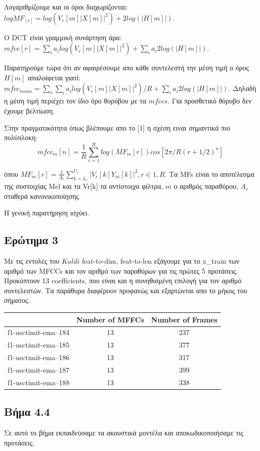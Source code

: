 \documentclass[12pt]{article}
\begin{document}
Λογαριθμίζουμε και οι όροι διαχωρίζονται:
$logMF_[r] =  log(V_r[m]|X[m]|^2) + 2log(|H[m]|) $. 

Ο DCT είναι γραμμική συνάρτηση άρα: $mfcc[r] =  \sum_i a_i log(V_r[m]|X[m]|^2) + \sum_i a_i 2log(|H[m]|)$. 

Παρατηρούμε τώρα ότι αν αφαιρέσουμε απο κάθε συντελεστή την μέση τιμή ο όρος $H[m]$ απαλοίφεται γιατί: $mfcc_{mean} = \sum_r \sum_i a_i log(V_r[m]|X[m]|^2)/R + \sum_i a_i 2log(|H[m]|)$. Δηλαδή η μέση τιμή περιέχει τον ίδιο όρο θορύβου με τα $mfccs$. Για προσθετικό θόρυβο δεν έχουμε βελτίωση. 

Στην πραγματικότητα όπως βλέπουμε απο το [1] η σχέση ειναι σημαντικά πιο πολύπλοκη: 
$$mfcc_m[n] = \frac{1}{R} \sum_{r=1}^R log(MF_m[r])cos[2π/R(r+1/2)^n]$$

όπου $MF_m[r] = \frac{1}{A_r} \sum_{k=L_r}^{U_r} |V_r[k] Y_m[k]|^2 , r \in{1,R}$. 
Τα MFs είναι το αποτέλεσμα της συστοιχίας Mel και τα Vr[k] τα αντίστοιχα φίλτρα, $m$ ο αριθμός παραθύρου, $A_r$ σταθερά κανονικοποίησης. 

Η γενική παρατήρηση ισχύει.

\subsection*{Ερώτημα 3}

Με τις εντολές του $Kaldi$ feat-to-dim, feat-to-len εξάγουμε για το x\_train των αριθμό των MFCCs και τον αριθμό των παραθύρων για  τις πρώτες 5 προτάσεις. Προκύπτουν 13 coefficients, που είναι και η συνηθισμένη επιλογή για τον αριθμό συντελεστών. Τα παράθυρα διαφέρουν προφανώς και εξαρτώνται απο το  μήκος του σήματος. 

\begin{center}
\begin{tabular}{ |c|c|c| } 
 \hline
    & Number of MFFCs & Number of Frames  \\
 \hline 
f1-usctimit-ema--184 & 13 & 237\\  \hline 
f1-usctimit-ema--185 & 13 & 377 \\  \hline 
f1-usctimit-ema--186 & 13 & 317 \\  \hline 
f1-usctimit-ema--187 & 13 & 399 \\  \hline 
f1-usctimit-ema--188 & 13 & 338\\  \hline 
\end{tabular}
\end{center}


\subsection*{Βήμα 4.4}
Σε αυτό το βήμα εκπαιδεύσαμε τα ακουστικά μοντέλα και αποκωδικοποιήσαμε τις προτάσεις.
\end{document}
